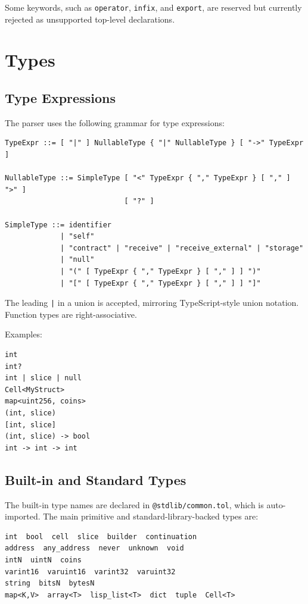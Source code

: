 \documentclass[12pt,oneside]{article}
\begin{document}
Some keywords, such as \verb|operator|, \verb|infix|, and \verb|export|, are
reserved but currently rejected as unsupported top-level declarations.

\section{Types}
\label{sec:types}
\subsection{Type Expressions}
The parser uses the following grammar for type expressions:

\begin{verbatim}
TypeExpr ::= [ "|" ] NullableType { "|" NullableType } [ "->" TypeExpr ]

NullableType ::= SimpleType [ "<" TypeExpr { "," TypeExpr } [ "," ] ">" ]
                            [ "?" ]

SimpleType ::= identifier
             | "self"
             | "contract" | "receive" | "receive_external" | "storage"
             | "null"
             | "(" [ TypeExpr { "," TypeExpr } [ "," ] ] ")"
             | "[" [ TypeExpr { "," TypeExpr } [ "," ] ] "]"
\end{verbatim}

The leading \verb+|+ in a union is accepted, mirroring TypeScript-style union
notation. Function types are right-associative.

Examples:

\begin{verbatim}
int
int?
int | slice | null
Cell<MyStruct>
map<uint256, coins>
(int, slice)
[int, slice]
(int, slice) -> bool
int -> int -> int
\end{verbatim}

\subsection{Built-in and Standard Types}
The built-in type names are declared in \verb|@stdlib/common.tol|, which is
auto-imported. The main primitive and standard-library-backed types are:

\begin{verbatim}
int  bool  cell  slice  builder  continuation
address  any_address  never  unknown  void
intN  uintN  coins
varint16  varuint16  varint32  varuint32
string  bitsN  bytesN
map<K,V>  array<T>  lisp_list<T>  dict  tuple  Cell<T>
\end{verbatim}
\end{document}
